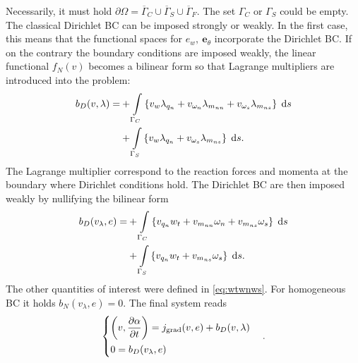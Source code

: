 \documentclass{ifacconf}
\begin{document}
Necessarily, it must hold $\partial \Omega  = \overline{\Gamma}_{C} \cup \overline{\Gamma}_{S} \cup \overline{\Gamma}_{F}$. The set $\Gamma_{C}$ or $\Gamma_{S}$ could be empty. The classical Dirichlet BC can be imposed strongly or weakly. In the first case, this means that the functional spaces for $e_w, \ \bm{e}_{\theta}$ incorporate the Dirichlet BC.  If on the contrary the boundary conditions are imposed weakly, the linear functional $f_N(v)$ becomes a bilinear form so that Lagrange multipliers are introduced into the problem:
\begin{equation}
\begin{aligned}
b_D(v,\lambda) =  &+\displaystyle\int_{\Gamma_C} \left\{ v_w \lambda_{q_n} +  v_{\omega_n} \lambda_{m_{nn}} + v_{\omega_s} \lambda_{m_{ns}} \right\}  \d{s} \\
&+\displaystyle\int_{\Gamma_S} \left\{ v_w \lambda_{q_n} + v_{\omega_s} \lambda_{m_{ns}} \right\}  \d{s}.
\end{aligned}
\end{equation}
The Lagrange multiplier correspond to the reaction forces and momenta at the boundary where Dirichlet conditions hold. The Dirichlet BC are then imposed weakly by nullifying the bilinear form
\begin{equation}
\begin{aligned}
b_D(v_\lambda, e) =  &+\displaystyle\int_{\Gamma_C} \left\{ v_{q_n} w_t +  v_{m_{nn}} \omega_n + v_{m_{ns}} \omega_s \right\}  \d{s} \\
&+\displaystyle\int_{\Gamma_S} \left\{ v_{q_n} w_t + v_{m_{ns}} \omega_s \right\}  \d{s}.
\end{aligned}
\end{equation}
The other quantities of interest were defined in \eqref{eq:wtwnws}. For homogeneous BC it holds $b_N(v_\lambda, e) = 0$. The final system reads 
\begin{equation}
\begin{cases}
\displaystyle \left(v, \diffp{\alpha}{t}\right) = j_{\text{grad}}(v, e) + b_D(v,\lambda) \vspace{1mm} \\
0 = b_D(v_\lambda, e)
\end{cases}.
\end{equation}
\end{document}
